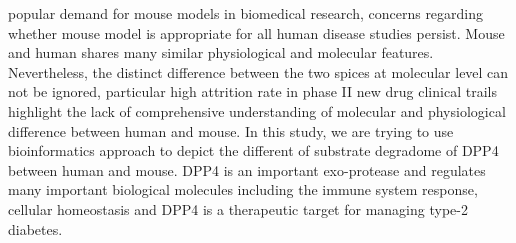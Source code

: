 \Regardless popular demand for mouse models in biomedical research, concerns regarding whether mouse model is appropriate for all human disease studies persist. Mouse and human shares many similar physiological and molecular features. Nevertheless, the distinct difference between the two spices at molecular level can not be ignored, particular high attrition rate in phase II new drug clinical trails highlight the lack of comprehensive understanding of molecular and physiological difference between human and mouse. In this study, we are trying to use bioinformatics approach to depict the different of substrate degradome of DPP4 between human and mouse. DPP4 is an important exo-protease and regulates many important biological molecules including the immune system response, cellular homeostasis and DPP4 is a therapeutic target for managing type-2 diabetes. 
